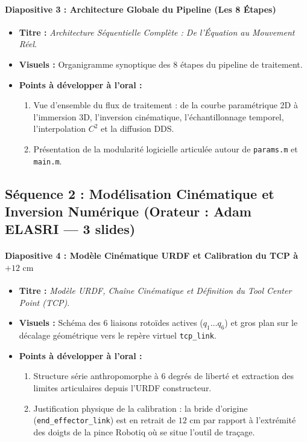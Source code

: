 \documentclass[11pt,a4paper]{report}
\begin{document}
\paragraph{Diapositive 3 : Architecture Globale du Pipeline (Les 8 Étapes)}
\begin{itemize}
    \item \textbf{Titre :} \textit{Architecture Séquentielle Complète : De l'Équation au Mouvement Réel}.
    \item \textbf{Visuels :} Organigramme synoptique des 8 étapes du pipeline de traitement.
    \item \textbf{Points à développer à l'oral :}
    \begin{enumerate}
        \item Vue d'ensemble du flux de traitement : de la courbe paramétrique 2D à l'immersion 3D, l'inversion cinématique, l'échantillonnage temporel, l'interpolation $C^2$ et la diffusion DDS.
        \item Présentation de la modularité logicielle articulée autour de \texttt{params.m} et \texttt{main.m}.
    \end{enumerate}
\end{itemize}

\subsection{Séquence 2 : Modélisation Cinématique et Inversion Numérique (Orateur : Adam ELASRI — 3 slides)}

\paragraph{Diapositive 4 : Modèle Cinématique URDF et Calibration du TCP à $+12\text{ cm}$}
\begin{itemize}
    \item \textbf{Titre :} \textit{Modèle URDF, Chaîne Cinématique et Définition du Tool Center Point (TCP)}.
    \item \textbf{Visuels :} Schéma des 6 liaisons rotoïdes actives ($q_1 \dots q_6$) et gros plan sur le décalage géométrique vers le repère virtuel \texttt{tcp\_link}.
    \item \textbf{Points à développer à l'oral :}
    \begin{enumerate}
        \item Structure série anthropomorphe à 6 degrés de liberté et extraction des limites articulaires depuis l'URDF constructeur.
        \item Justification physique de la calibration : la bride d'origine (\texttt{end\_effector\_link}) est en retrait de $12\text{ cm}$ par rapport à l'extrémité des doigts de la pince Robotiq où se situe l'outil de traçage.
    \end{enumerate}
\end{itemize}
\end{document}
